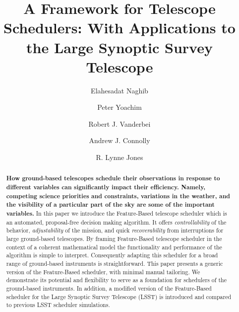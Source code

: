 \documentclass[12pt]{aastex62}
\theoremstyle{definition}
\begin{document}
\title{A Framework for Telescope Schedulers: With Applications to the Large Synoptic Survey Telescope}

\author{Elahesadat Naghib}

\author{Peter Yoachim} 

\author{Robert J. Vanderbei} 

\author{Andrew J. Connolly} 

\author{R. Lynne Jones}



\begin{abstract}
{\bf How ground-based telescopes schedule their observations in response to different variables can significantly impact their efficiency. Namely, competing science priorities and constraints, variations in the weather, and the visibility of a particular part of the sky are some of the important variables.\bf} In this paper we introduce the Feature-Based telescope scheduler which is an automated, proposal-free decision making algorithm. It offers \textit{controllability} of the behavior, \textit{adjustability} of the mission, and quick \textit{recoverability} from interruptions for large ground-based telescopes. By framing Feature-Based telescope scheduler in the context of a coherent mathematical model the functionality and performance of the algorithm is simple to interpret. Consequently adapting this scheduler for a broad range of ground-based instruments is straightforward. This paper presents a generic version of the Feature-Based scheduler, with minimal manual tailoring. We demonstrate its potential and flexibility to serve as a foundation for schedulers of the ground-based instruments. In addition, a modified version of the Feature-Based scheduler for the Large Synoptic Survey Telescope (LSST) is introduced and compared to previous LSST scheduler simulations.
\end{abstract}
\end{document}

